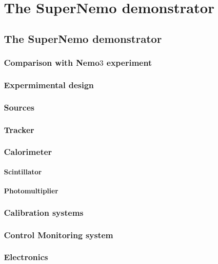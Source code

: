 \chapter{The SuperNemo demonstrator}
\label{ch:detector}

\section{The SuperNemo demonstrator}
\subsection{Comparison with Nemo$3$ experiment}
\subsection{Expermimental design}
\subsection{Sources}
\subsection{Tracker}
\subsection{Calorimeter}
\label{subsec:SN_calo}



\subsubsection{Scintillator}





\subsubsection{Photomultiplier}
\label{sec:calorimeter}
\subsection{Calibration systems}
\subsection{Control Monitoring system}
\subsection{Electronics}

